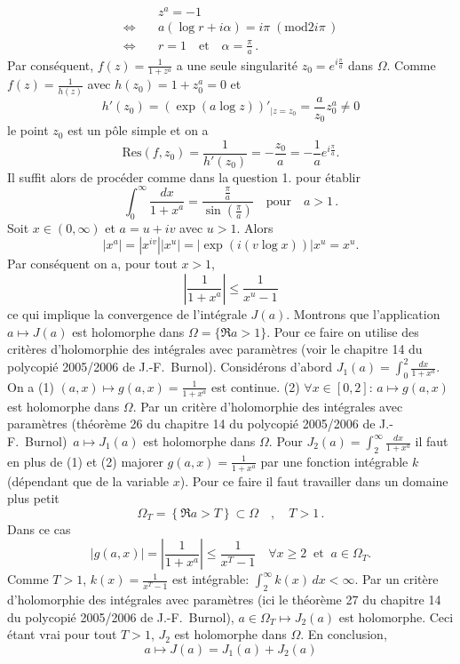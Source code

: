 {\begin{enumerate}
{$$\begin{aligned}
&z^a =-1   \\
\Longleftrightarrow \quad & a(\log r +i \alpha ) = i\pi \; (\mathrm{mod} 2i\pi \, ) \\
\Longleftrightarrow\quad & r=1 \quad \text{et} \quad \alpha =\frac{\pi}{a}\, .
\end{aligned}$$
Par cons\'equent, $f(z)=\frac{1}{1+z^a}$ a une seule singularit\'e $z_0= e^{i\frac{\pi}{a}}$ dans $\Omega$.
Comme $f(z)=\frac{1}{h(z)}$ avec $h(z_0)=1+z_0^a =0$ et
$$h'(z_0)=\left(  \exp (a\log z)\right)'_{|z=z_0}=\frac{a}{z_0}z_0^a \neq 0$$
le point $z_0$ est un p\^ole simple et on a
$$\mathrm{Res} (f,z_0) =\frac{1}{h'(z_0)} =-\frac{z_0}{a} = -\frac{1}{a} e^{i\frac{\pi}{a}}.$$
Il suffit alors de proc\'eder comme dans la question 1. pour \'etablir
$$\int_0^\infty \frac{dx}{1+x^a}=\frac{\frac{\pi}{a}}{\sin\left(\frac{\pi}{a}\right)} \quad \text{pour} \quad a>1\, .$$
Soit $x\in(0,\infty )$ et $a=u+iv$ avec $u>1$. Alors
$$|x^a|=|x^{iv}||x^u|=|\exp \left( i(v\log x)\right)|x^u =x^u.$$
Par cons\'equent on a, pour tout $x>1$,
$$\left| \frac{1}{1+x^a}\right|\leq  \frac{1}{x^u-1}$$
ce qui implique la convergence de l'int\'egrale $J(a)$.
Montrons que l'application $a\mapsto J(a)$ est holomorphe dans $\Omega=\{ \Re a >1\}$.
Pour ce faire on utilise des critères d'holomorphie des intégrales avec paramètres (voir le chapitre 14 du polycopi\'e 2005/2006 de J.-F.~Burnol).
Consid\'erons d'abord
$J_1(a)=\int_0^2 \frac{dx}{1+x^a}$. On a
(1) $(a,x)\mapsto g(a,x)=\frac{1}{1+x^a}$ est continue.
(2) $\forall x\in [0,2]$: $a\mapsto g(a,x)$ est holomorphe dans $\Omega$.
\noindent Par un critère d'holomorphie des intégrales avec paramètres  (th\'eor\`eme 26 du chapitre 14 du polycopi\'e 2005/2006 de J.-F.~Burnol)\, $a\mapsto J_1(a)$ est holomorphe dans $\Omega$.
Pour $J_2(a)=\int_2^\infty \frac{dx}{1+x^a}$ il faut en plus de (1) et (2) majorer
$g(a,x)=\frac{1}{1+x^a}$ par une fonction int\'egrable $k$ (d\'ependant que de la variable $x$).
Pour ce faire il faut travailler dans un domaine plus petit
$$\Omega_T =\left\{ \Re a>T\right\} \subset \Omega \quad , \quad T>1\, .$$
Dans ce cas
$$|g(a,x)| = \left| \frac{1}{1+x^a} \right| \leq \frac{1}{x^T-1} \quad \forall x\geq 2 \;\; \text{et} \;\; a\in \Omega _T.$$
Comme $T>1$, $k(x)=\frac{1}{x^T-1}$ est int\'egrable: $\int _2^\infty k(x)\, dx <\infty$.
Par un critère d'holomorphie des intégrales avec paramètres (ici le th\'eor\`eme 27 du chapitre 14 du polycopi\'e 2005/2006 de J.-F.~Burnol), $a\in \Omega_T \mapsto J_2(a)$ est holomorphe.
Ceci \'etant vrai pour tout $T>1$, $J_2$ est holomorphe dans $\Omega$. En conclusion,
$$a \mapsto J(a)=J_1(a)+J_2(a)$$
}
\end{enumerate}}
